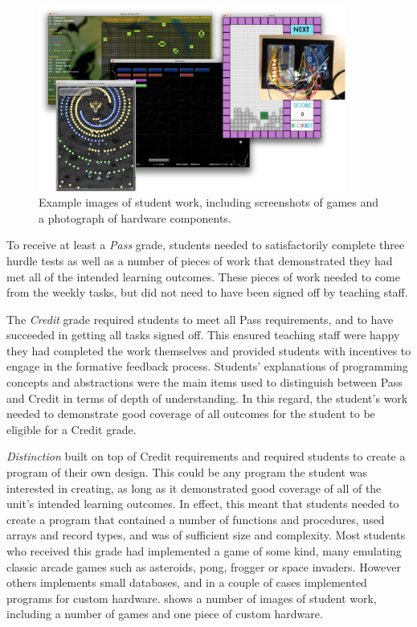 \begin{figure}[p]
	\centering
	\includegraphics[width=0.9\textwidth]{StudentGames}
	\caption{Example images of student work, including screenshots of games and a photograph of hardware components.  }
	\label{fig:student_games}
\end{figure}

To receive at least a \emph{Pass} grade, students needed to satisfactorily complete three hurdle tests as well as a number of pieces of work that demonstrated they had met all of the intended learning outcomes. These pieces of work needed to come from the weekly tasks, but did not need to have been signed off by teaching staff. 

The \emph{Credit} grade required students to meet all Pass requirements, and to have succeeded in getting all tasks signed off. This ensured teaching staff were happy they had completed the work themselves and provided students with incentives to engage in the formative feedback process. Students' explanations of programming concepts and abstractions were the main items used to distinguish between Pass and Credit in terms of depth of understanding. In this regard, the student's work needed to demonstrate good coverage of all outcomes for the student to be eligible for a Credit grade.

\emph{Distinction} built on top of Credit requirements and required students to create a program of their own design. This could be any program the student was interested in creating, as long as it demonstrated good coverage of all of the unit's intended learning outcomes. In effect, this meant that students needed to create a program that contained a number of functions and procedures, used arrays and record types, and was of sufficient size and complexity. Most students who received this grade had implemented a game of some kind, many emulating classic arcade games such as asteroids, pong, frogger or space invaders. However others implements small databases, and in a couple of cases implemented programs for custom hardware.  shows a number of images of student work, including a number of games and one piece of custom hardware.

